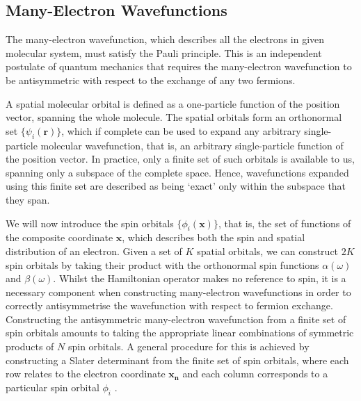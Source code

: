 
\subsection{\label{many-electron-wavefunctions}Many-Electron Wavefunctions}


The many-electron wavefunction, which describes all the electrons in given molecular system, must satisfy the Pauli principle. This is an independent postulate of quantum mechanics that requires the many-electron wavefunction to be antisymmetric with respect to the exchange of any two fermions.

A spatial molecular orbital is defined as a one-particle function of the position vector, spanning the whole molecule. The spatial orbitals form an orthonormal set $\{\psi_i(\mathbf{r})\}$, which if complete can be used to expand any arbitrary single-particle molecular wavefunction, that is, an arbitrary single-particle function of the position vector. In practice, only a finite set of such orbitals is available to us, spanning only a subspace of the complete space. Hence, wavefunctions expanded using this finite set are described as being `exact' only within the subspace that they span.

We will now introduce the spin orbitals $\{\phi_i(\mathbf{x})\}$, that is, the set of functions of the composite coordinate $\mathbf{x}$, which describes both the spin and spatial distribution of an electron. Given a set of $K$ spatial orbitals, we can construct $2K$ spin orbitals by taking their product with the orthonormal spin functions $\alpha(\omega)$ and $\beta(\omega)$. Whilst the Hamiltonian operator makes no reference to spin, it is a necessary component when constructing many-electron wavefunctions in order to correctly antisymmetrise the wavefunction with respect to fermion exchange. Constructing the antisymmetric many-electron wavefunction from a finite set of spin orbitals amounts to taking the appropriate linear combinations of symmetric products of $N$ spin orbitals. A general procedure for this is achieved by constructing a Slater determinant from the finite set of spin orbitals, where each row relates to the electron coordinate $\mathbf{x_n}$ and each column corresponds to a particular spin orbital $\phi_i$ \cite{Atilla1996}. 

